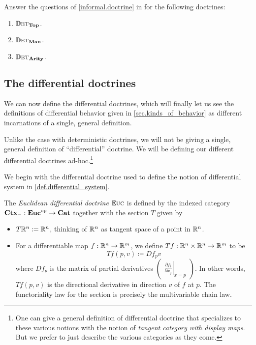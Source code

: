 \documentclass[DynamicalBook]{subfiles}
\begin{document}
\begin{exercise}
Answer the questions of \cref{informal.doctrine} in for the following doctrines:
\begin{enumerate}
   \item $\mathbb{D}\textsc{et}_{\textbf{Top}}$.
   \item $\mathbb{D}\textsc{et}_{\textbf{Man}}$.
   \item $\mathbb{D}\textsc{et}_{\textbf{Arity}}$.
\end{enumerate}
\end{exercise}

\subsection{The differential doctrines}

We can now define the differential doctrines, which will finally let us see the
definitions of differential behavior given in \cref{sec.kinds_of_behavior} as
different incarnations of a single, general definition.

Unlike the case with deterministic doctrines, we will not be giving a single,
general definition of ``differential'' doctrine. We will be defining our
different differential doctrines ad-hoc.\footnote{One can give a general
  definition of differential doctrine that specializes to these various notions
  with the notion of \emph{tangent category with display maps}. But we prefer to
just describe the various categories as they come.}

We begin with the differential doctrine used to define the notion of
differential system in \cref{def.differential_system}. 
\begin{definition}\label{def.euclidean_diff_doctrine}
The \emph{Euclidean differential doctrine} $\mathbb{E}\textsc{uc}$ is defined by the indexed
category $\textbf{Ctx}_{-} : \textbf{Euc}^{\textnormal{op}} \to \textbf{Cat}$ together with the section $T$
given by 
\begin{itemize}
  \item $T\mathbb{R}^n := \mathbb{R}^n$, thinking of $\mathbb{R}^n$ as tangent space of a point in $\mathbb{R}^n$.
  \item For a differentiable map $ f : \mathbb{R}^n \to \mathbb{R}^m$, we define $Tf : \mathbb{R}^n
    \times \mathbb{R}^n \to \mathbb{R}^m$ to be 
\[
Tf(p, v) \coloneqq Df_p v
\]
where $Df_p$ is the matrix of partial derivatives \(\begin{pmatrix}
\left.\frac{\partial f_i}{\partial x_j}\right|_{x = p}
\end{pmatrix}\). 
In other words, $Tf(p, v)$ is the directional derivative in direction $v$ of $f$
at $p$. The functoriality law for the section is precisely the multivariable
chain law.
\end{itemize}
\end{definition}
\end{document}
